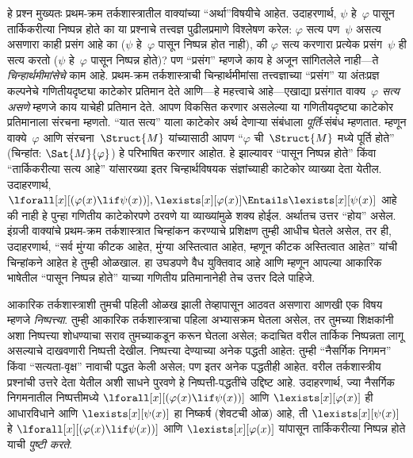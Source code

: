 हे प्रश्न मुख्यतः प्रथम-क्रम तर्कशास्त्रातील वाक्यांच्या
``अर्था''विषयीचे आहेत. उदाहरणार्थ, $\psi$ हे~$\varphi$ पासून तार्किकरीत्या
निष्पन्न होते का या प्रश्नाचे तत्त्वज्ञ पुढीलप्रमाणे विश्लेषण करेल:
$\varphi$ सत्य पण~$\psi$ असत्य असणारा काही प्रसंग आहे का ($\psi$ हे~$\varphi$
पासून निष्पन्न होत नाही), की $\varphi$ सत्य करणारा प्रत्येक प्रसंग~$\psi$ ही
सत्य करतो ($\psi$ हे~$\varphi$ पासून निष्पन्न होते)? पण ``प्रसंग'' म्हणजे काय
हे अजून सांगितलेले नाही---ते \emph{चिन्हार्थमीमांसेचे} काम आहे.
प्रथम-क्रम तर्कशास्त्राची चिन्हार्थमीमांसा तत्त्वज्ञाच्या ``प्रसंग'' या
अंतःप्रज्ञ कल्पनेचे गणितीयदृष्ट्या काटेकोर प्रतिमान देते आणि---हे
महत्त्वाचे आहे---एखाद्या प्रसंगात वाक्य~$\varphi$ \emph{सत्य असणे}
म्हणजे काय याचेही प्रतिमान देते. आपण विकसित करणार असलेल्या या
गणितीयदृष्ट्या काटेकोर प्रतिमानाला संरचना म्हणतो. ``यात सत्य''
याला काटेकोर अर्थ देणाऱ्या संबंधाला \emph{पूर्ति}-संबंध म्हणतात. म्हणून
वाक्ये~$\varphi$ आणि संरचना~$\Struct{M}$ यांच्यासाठी आपण
``$\varphi$ ची~$\Struct{M}$ मध्ये पूर्ति होते'' (चिन्हांत:
$\Sat{M}{\varphi}$) हे परिभाषित करणार आहोत. हे झाल्यावर ``पासून निष्पन्न
होते'' किंवा ``तार्किकरीत्या सत्य आहे'' यांसारख्या इतर चिन्हार्थविषयक
संज्ञांच्याही काटेकोर व्याख्या देता येतील. उदाहरणार्थ,
$\lforall[x][(\varphi(x) \lif \psi(x))],
\lexists[x][\varphi(x)] \Entails \lexists[x][\psi(x)]$ आहे की नाही हे पुन्हा
गणितीय काटेकोरपणे ठरवणे या व्याख्यांमुळे शक्य होईल. अर्थातच उत्तर
``होय'' असेल. इंग्रजी वाक्यांचे प्रथम-क्रम तर्कशास्त्रात चिन्हांकन
करण्याचे प्रशिक्षण तुम्ही आधीच घेतले असेल, तर ही, उदाहरणार्थ, ``सर्व
मुंग्या कीटक आहेत, मुंग्या अस्तित्वात आहेत, म्हणून कीटक अस्तित्वात
आहेत'' यांची चिन्हांकने आहेत हे तुम्ही ओळखाल. हा उघडपणे वैध युक्तिवाद
आहे आणि म्हणून आपल्या आकारिक भाषेतील ``पासून निष्पन्न होते'' याच्या
गणितीय प्रतिमानानेही तेच उत्तर दिले पाहिजे.


आकारिक तर्कशास्त्राशी तुमची पहिली ओळख झाली तेव्हापासून आठवत असणारा
आणखी एक विषय म्हणजे \emph{निष्पत्त्या}. तुम्ही आकारिक
तर्कशास्त्राचा पहिला अभ्यासक्रम घेतला असेल, तर तुमच्या शिक्षकांनी अशा
निष्पत्त्या शोधण्याचा सराव तुमच्याकडून करून घेतला असेल; कदाचित
वरील तार्किक निष्पन्नता लागू असल्याचे दाखवणारी निष्पत्ती देखील.
निष्पत्त्या देण्याच्या अनेक पद्धती आहेत: तुम्ही ``नैसर्गिक निगमन''
किंवा ``सत्यता-वृक्ष'' नावाची पद्धत केली असेल; पण इतर अनेक पद्धतीही
आहेत. वरील तर्कशास्त्रीय प्रश्नांची उत्तरे देता येतील अशी साधने पुरवणे
हे निष्पत्ती-पद्धतींचे उद्दिष्ट आहे. उदाहरणार्थ, ज्या नैसर्गिक
निगमनातील निष्पत्तीमध्ये $\lforall[x][(\varphi(x) \lif \psi(x))]$ आणि
$\lexists[x][\varphi(x)]$ ही आधारविधाने आणि $\lexists[x][\psi(x)]$ हा
निष्कर्ष (शेवटची ओळ) आहे, ती $\lexists[x][\psi(x)]$ हे
$\lforall[x][(\varphi(x) \lif \psi(x))]$ आणि $\lexists[x][\varphi(x)]$ यांपासून
तार्किकरीत्या निष्पन्न होते याची \emph{पुष्टी करते}.

